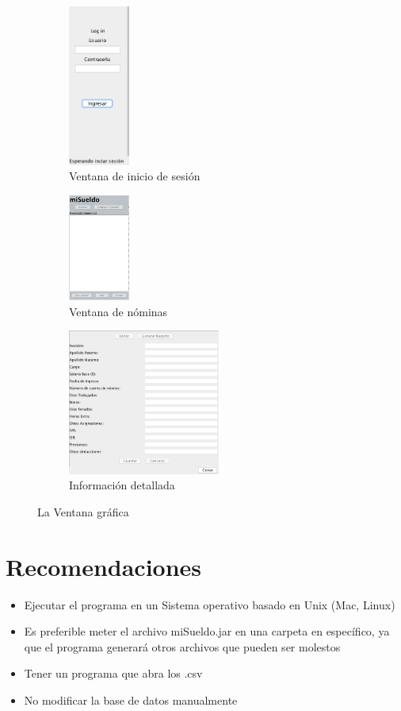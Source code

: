 \documentclass[12pt]{amsart}
\begin{document}
\begin{figure}[h]
	\begin{subfigure}{0.5\textwidth}
	\includegraphics[width=20mm]{Login.jpg}
	\caption{Ventana de inicio de sesi\'on}
	\label{fig:Login}
	\end{subfigure}
	\begin{subfigure}{0.5\textwidth}
	\includegraphics[width=20mm]{sueldo.png}
	\caption{Ventana de n\'ominas}
	\label{fig:sueldo}
	\end{subfigure}
	\begin{subfigure}{0.5\textwidth}
	\includegraphics[width=50mm]{info.jpg}
	\caption{Informaci\'on detallada}
	\label{fig:Info}
	\end{subfigure}
	\caption{La Ventana gr\'afica}
\end{figure}

\section{Recomendaciones}
\begin{itemize}
\item Ejecutar el programa en un Sistema operativo basado en Unix (Mac, Linux)
\item Es preferible meter el archivo miSueldo.jar en una carpeta en espec\'ifico, ya que el programa generar\'a otros archivos que pueden ser molestos
\item Tener un programa que abra los .csv
\item No modificar la base de datos manualmente
\end{itemize}
\end{document}
